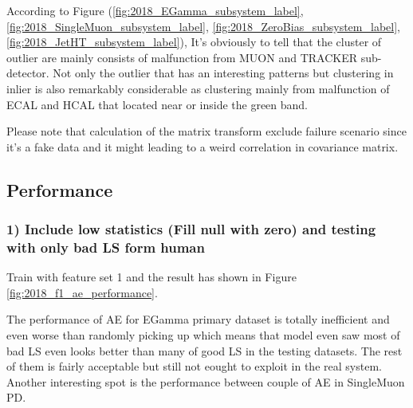 According to Figure (\ref{fig:2018_EGamma_subsystem_label}, \ref{fig:2018_SingleMuon_subsystem_label}, \ref{fig:2018_ZeroBias_subsystem_label}, \ref{fig:2018_JetHT_subsystem_label}), It's obviously to tell that the cluster of outlier are mainly consists of malfunction from MUON and TRACKER sub-detector. Not only the outlier that has an interesting patterns but clustering in inlier is also remarkably considerable as clustering mainly from malfunction of ECAL and HCAL that located near or inside the green band.

Please note that calculation of the matrix transform exclude failure scenario since it's a fake data and it might leading to a weird correlation in covariance matrix.

\subsection{Performance}
\subsubsection{1) Include low statistics (Fill null with zero) and testing with only bad LS form human}
Train with feature set 1 and the result has shown in Figure \ref{fig:2018_f1_ae_performance}.

The performance of AE for EGamma primary dataset is totally inefficient and even worse than randomly picking up which means that model even saw most of bad LS even looks better than many of good LS in the testing datasets. The rest of them is fairly acceptable but still not eought to exploit in the real system. Another interesting spot is the performance between couple of AE in SingleMuon PD. 

